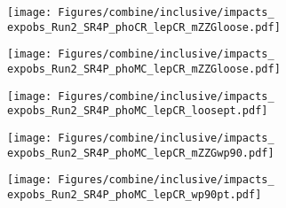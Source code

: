 \label{sec:impacts_inclusive}

\begin{figure}
  \centering
  \texttt{[image: Figures/combine/inclusive/impacts\_\\expobs\_Run2\_SR4P\_phoCR\_lepCR\_mZZGloose.pdf]}
  \caption{}
  \label{fig:inclusive_cutID_phoCR_mZZGloose}
\end{figure}

\begin{figure}
  \centering
  \texttt{[image: Figures/combine/inclusive/impacts\_\\expobs\_Run2\_SR4P\_phoMC\_lepCR\_mZZGloose.pdf]}
  \caption{}
  \label{fig:inclusive_cutID_phoMC_mZZGloose}
\end{figure}

\begin{figure}
  \centering
  \texttt{[image: Figures/combine/inclusive/impacts\_\\expobs\_Run2\_SR4P\_phoMC\_lepCR\_loosept.pdf]}
  \caption{}
  \label{fig:inclusive_cutID_phoMC_loosept}
\end{figure}

\begin{figure}
  \centering
  \texttt{[image: Figures/combine/inclusive/impacts\_\\expobs\_Run2\_SR4P\_phoMC\_lepCR\_mZZGwp90.pdf]}
  \caption{}
  \label{fig:inclusive_mvaID_phoMC_mZZGwp90}
\end{figure}

\begin{figure}
  \centering
  \texttt{[image: Figures/combine/inclusive/impacts\_\\expobs\_Run2\_SR4P\_phoMC\_lepCR\_wp90pt.pdf]}
  \caption{}
  \label{fig:inclusive_mvaID_phoMC_wp90pt}
\end{figure}

